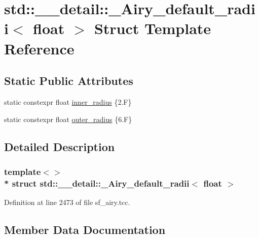 \hypertarget{structstd_1_1____detail_1_1__Airy__default__radii_3_01float_01_4}{}\section{std\+:\+:\+\_\+\+\_\+detail\+:\+:\+\_\+\+Airy\+\_\+default\+\_\+radii$<$ float $>$ Struct Template Reference}
\label{structstd_1_1____detail_1_1__Airy__default__radii_3_01float_01_4}
\subsection*{Static Public Attributes}
\begin{DoxyCompactItemize}
\item 
static constexpr float \hyperlink{structstd_1_1____detail_1_1__Airy__default__radii_3_01float_01_4_a798f4ff51a7e6a7dc5d0e5a670899c3a}{inner\+\_\+radius} \{2.\+F\}
\item 
static constexpr float \hyperlink{structstd_1_1____detail_1_1__Airy__default__radii_3_01float_01_4_ad8ea3a344f9748cf9bf32bcc17ca5d0b}{outer\+\_\+radius} \{6.\+F\}
\end{DoxyCompactItemize}


\subsection{Detailed Description}
\subsubsection*{template$<$$>$\\*
struct std\+::\+\_\+\+\_\+detail\+::\+\_\+\+Airy\+\_\+default\+\_\+radii$<$ float $>$}



Definition at line 2473 of file sf\+\_\+airy.\+tcc.



\subsection{Member Data Documentation}
